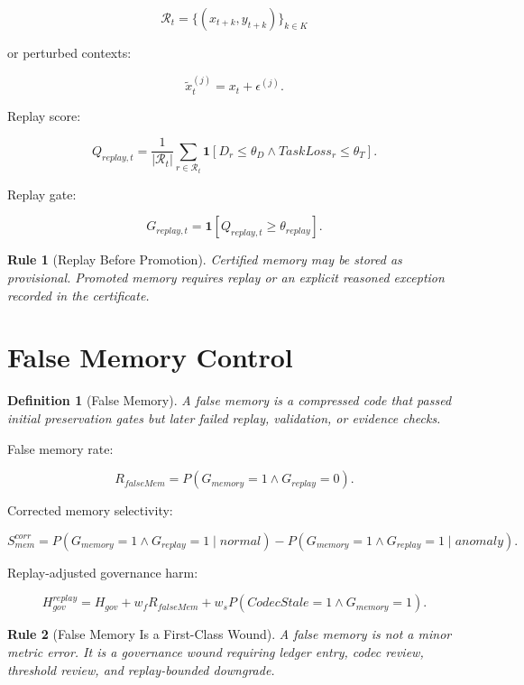 \documentclass[12pt]{article}
\newtheorem{definition}{Definition}
\newtheorem{rulebox}{Rule}
\begin{document}
\[
\mathcal{R}_t=\{(x_{t+k}, y_{t+k})\}_{k\in K}
\]

or perturbed contexts:

\[
\tilde{x}_{t}^{(j)}=x_t+\epsilon^{(j)}.
\]

Replay score:

\[
\boxed{
Q_{replay,t}
=
\frac{1}{|\mathcal{R}_t|}\sum_{r\in\mathcal{R}_t}
\mathbf{1}[D_r\leq\theta_D\wedge TaskLoss_r\leq\theta_T].
}
\]

Replay gate:

\[
G_{replay,t}=\mathbf{1}[Q_{replay,t}\geq\theta_{replay}].
\]

\begin{rulebox}[Replay Before Promotion]
Certified memory may be stored as provisional. Promoted memory requires replay
or an explicit reasoned exception recorded in the certificate.
\end{rulebox}

\section{False Memory Control}

\begin{definition}[False Memory]
A false memory is a compressed code that passed initial preservation gates but
later failed replay, validation, or evidence checks.
\end{definition}

False memory rate:

\[
\boxed{
R_{falseMem}=P(G_{memory}=1\wedge G_{replay}=0).
}
\]

Corrected memory selectivity:

\[
\boxed{
S^{corr}_{mem}
=
P(G_{memory}=1\wedge G_{replay}=1\mid normal)
-
P(G_{memory}=1\wedge G_{replay}=1\mid anomaly).
}
\]

Replay-adjusted governance harm:

\[
\boxed{
H^{replay}_{gov}
=
H_{gov}+w_fR_{falseMem}+w_sP(CodecStale=1\wedge G_{memory}=1).
}
\]

\begin{rulebox}[False Memory Is a First-Class Wound]
A false memory is not a minor metric error. It is a governance wound requiring
ledger entry, codec review, threshold review, and replay-bounded downgrade.
\end{rulebox}
\end{document}
